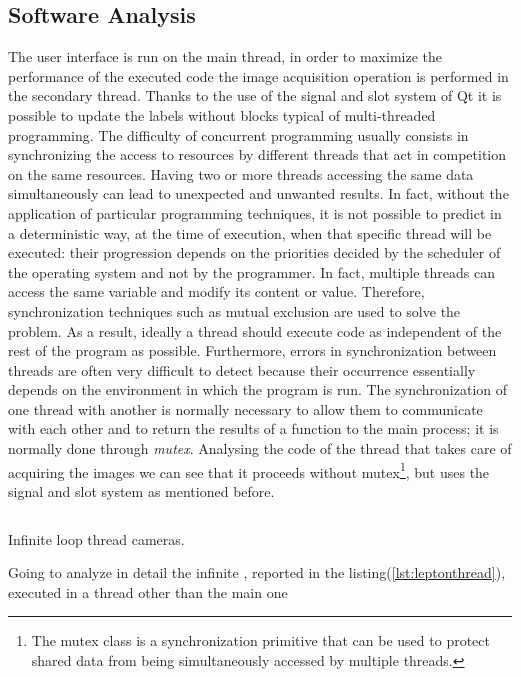\subsection{Software Analysis}
\label{ssec:raspberry-softw-analysis}
The user interface is run on the main thread, in order to maximize the
performance of the executed code the image acquisition operation is performed in
the secondary thread. Thanks to the use of the signal and slot system of Qt it
is possible to update the labels without blocks typical of multi-threaded
programming. 
The difficulty of concurrent programming usually consists in
synchronizing the access to resources by different threads that act in
competition on the same resources. Having two or more threads accessing the same
data simultaneously can lead to unexpected and unwanted results. 
In fact, without the application of particular programming techniques, it is not
possible to predict in a deterministic way, at the time of execution, when that
specific thread will be executed: their progression depends on the priorities
decided by the scheduler of the operating system and not by the programmer. 
In fact, multiple threads can access the same variable and modify its content or
value. Therefore, synchronization techniques such as mutual exclusion are used
to solve the problem. As a result, ideally a thread should execute code as
independent of the rest of the program as possible. Furthermore, errors in
synchronization between threads are often very difficult to detect because their
occurrence essentially depends on the environment in which the program is run.
The synchronization of one thread with another is normally necessary to allow
them to communicate with each other and to return the results of a function to
the main process; it is normally done through \emph{mutex}\cite{wiki:thread}.
Analysing the code of the thread that takes care of acquiring the images we can 
see that it proceeds without mutex\footnote{The mutex class is a synchronization
primitive that can be used to protect shared data from being simultaneously
accessed by multiple threads.}, but uses the signal and slot system as mentioned
before.
%
\begin{listing}[ht] 
\inputminted[bgcolor=bg,frame=lines,framesep=2mm, linenos=true, autogobble, breaklines=true, fontsize=\scriptsize]{c++}{software/code/leptonthread.cpp} 
\caption{Infinite loop thread cameras.} 
\label{lst:leptonthread} 
\end{listing}
%
Going to analyze in detail the infinite , reported in the
listing(\ref{lst:leptonthread}), executed in a thread other than the main one
